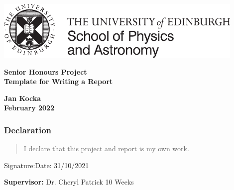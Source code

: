 \documentclass[a4paper,12pt]{article}
\newcommand{\efn}{e4$\nu$}
\begin{document}
\pagestyle{empty}
\par\noindent\includegraphics[width=12cm]{PandA_crest.pdf}
\par\noindent

\vspace*{2cm}

\begin{center}
        \Large\bf \Large\bf Senior Honours Project \\
        \LARGE\bf Template for Writing a Report
\end{center}

\vspace*{0.5cm}

\begin{center}
        \bf Jan Kocka \\
        February 2022
\end{center}
\vspace*{5mm}

\begin{abstract}
    In this project we continue the work on data from \efn.
    We further inspect the data generated with GENIE, mainly looking at the Delta resonances and compare then to data from the CLAS experiment.
\end{abstract}

\vspace*{1cm}

\subsubsection*{Declaration}

\begin{quotation}
  I declare that this project and report is my own work.
\end{quotation}

\vspace*{2cm}
Signature:\hspace*{8cm}Date:  31/10/2021

\vfill
{\bf Supervisor:} Dr. Cheryl Patrick
\hfill
10 Weeks
\newpage

\pagestyle{plain}
\setcounter{page}{1}

\tableofcontents
\end{document}
